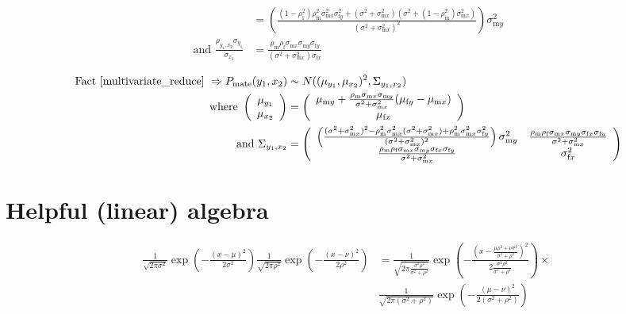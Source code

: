 \documentclass{article}
\newcommand{\x}[1]{\text{#1}}
\begin{document}
\begin{align*}
\\&=\left(\frac{(1-\rho_\x{f}^2)\rho_\x{m}^2\sigma_{\x{m}x}^2\sigma_{\x{f}y}^2+(\sigma^2+\sigma_{\x{m}x}^2)(\sigma^2+(1-\rho_\x{m}^2)\sigma_{\x{m}x}^2)}{(\sigma^2+\sigma_{\x{m}x}^2)^2}\right)\sigma_{\x{m}y}^2
\\ \text { and } \frac{\rho_{y_1,x_2}\sigma_{y_1}}{\sigma_{x_2}}&=\frac{\rho_\x{m}\rho_\x{f}\sigma_{\x{m}x}\sigma_{\x{m}y}\sigma_{\x{f}y}}{(\sigma^2+\sigma_{\x{m}x}^2)\sigma_{\x{f}x}}
\end{align*}

\begin{align*}
\text{ Fact \ref{multivariate_reduce} } \Rightarrow P_\text{mate}(y_1,x_2)&\sim N((\mu_{y_1},\mu_{x_2})^2,\Sigma_{y_1,x_2}) 
\\ \text{ where } \left(\begin{array}{c}\mu_{y_1} \\  \mu_{x_2} \end{array}\right)&=\left(\begin{array}{c}\mu_{\x{m}y}+\frac{\rho_\x{m}\sigma_{\x{m}x}\sigma_{\x{m}y}}{\sigma^2+\sigma_{\x{m}x}^2}(\mu_{\x{f}y}-\mu_{\x{m}x}) \\ \mu_{\x{f}x} \end{array}\right)
\\ \text{ and } \Sigma_{y_1,x_2}&=\left(\begin{array}{cc}\left(\frac{(\sigma^2+\sigma_{\x{m}x}^2)^2-\rho_\x{m}^2\sigma_{\x{m}x}^2(\sigma^2+\sigma_{\x{m}x}^2)+\rho_\x{m}^2\sigma_{\x{m}x}^2\sigma_{\x{f}y}^2}{(\sigma^2+\sigma_{\x{m}x}^2)^2}\right)\sigma_{\x{m}y}^2 & \frac{\rho_\x{m}\rho_\x{f}\sigma_{\x{m}x}\sigma_{\x{m}y}\sigma_{\x{f}x}\sigma_{\x{f}y}}{\sigma^2+\sigma_{\x{m}x}^2} \\ \frac{\rho_\x{m}\rho_\x{f}\sigma_{\x{m}x}\sigma_{\x{m}y}\sigma_{\x{f}x}\sigma_{\x{f}y}}{\sigma^2+\sigma_{\x{m}x}^2}& \sigma_{\x{f}x}^2 \end{array}\right)
\end{align*}
\section{Helpful (linear) algebra}

\begin{fact} \label{univariate}
\begin{align*}
\frac{1}{\sqrt{2\pi\sigma^2}}\exp\left(-\frac{(x-\mu)^2}{2\sigma^2}\right)\frac{1}{\sqrt{2\pi\rho^2}}\exp\left(-\frac{(x-\nu)^2}{2\rho^2}\right)&=\frac{1}{\sqrt{2\pi\frac{\sigma^2\rho^2}{\sigma^2+\rho^2}}}\exp\left(-\frac{\left(x-\frac{\mu\rho^2+\nu\sigma^2}{\sigma^2+\rho^2}\right)^2}{2\frac{\sigma^2\rho^2}{\sigma^2+\rho^2}}\right)\times
\\&\frac{1}{\sqrt{2\pi(\sigma^2+\rho^2)}}\exp\left(-\frac{(\mu-\nu)^2}{2(\sigma^2+\rho^2)}\right)
\end{align*}
\end{fact}
\end{document}
